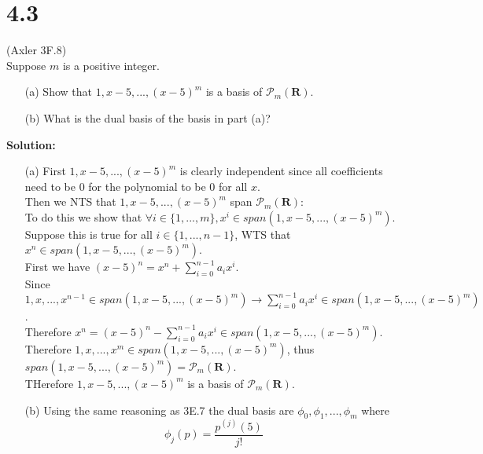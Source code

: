 \documentclass{article}
\begin{document}
\section*{4.3}
(Axler 3F.8)\\
Suppose $m$ is a positive integer.
\begin{itemize}
    \item[(a)] Show that $1, x-5, ..., (x-5)^m$ is a basis of $\mathcal{P}_m(\mathbf{R})$.
    \item[(b)] What is the dual basis of the basis in part (a)?
\end{itemize}
\textbf{Solution:}
\begin{addmargin}[1em]{0em}
     \begin{itemize}
        \item[(a)] First $1, x-5, ..., (x-5)^m$ is clearly independent since all coefficients need to be $0$ for the polynomial to be $0$ for all $x$.\\
        Then we NTS that $1, x-5, ..., (x-5)^m$ span $\mathcal{P}_m(\mathbf{R})$:\\
        To do this we show that $\forall i \in \{1, ..., m\}, x^i \in span(1, x-5, ..., (x-5)^m)$.\\
        Suppose this is true for all $i \in \{1, ..., n-1\}$, WTS that $x^n \in span(1, x-5, ..., (x-5)^m)$.\\
        First we have $(x-5)^n = x^n + \sum_{i=0}^{n-1}a_ix^i$.\\
        Since $1, x, ..., x^{n-1} \in span(1, x-5, ..., (x-5)^m) \rightarrow \sum_{i=0}^{n-1}a_ix^i \in span(1, x-5, ..., (x-5)^m)$.\\
        Therefore $x^n = (x-5)^n - \sum_{i=0}^{n-1}a_ix^i \in span(1, x-5, ..., (x-5)^m)$.\\
        Therefore $1, x, ..., x^m \in span(1, x-5, ..., (x-5)^m)$, thus $span(1, x-5, ..., (x-5)^m) = \mathcal{P}_m(\mathbf{R})$.\\
        THerefore $1, x-5, ..., (x-5)^m$ is a basis of $\mathcal{P}_m(\mathbf{R})$.
        \item[(b)] Using the same reasoning as 3E.7 the dual basis are $\phi_0, \phi_1, ..., \phi_m$ where
        \begin{equation*}
            \phi_j(p) = \frac{p^{(j)}(5)}{j!}
        \end{equation*}
     \end{itemize}
\end{addmargin}
\end{document}
